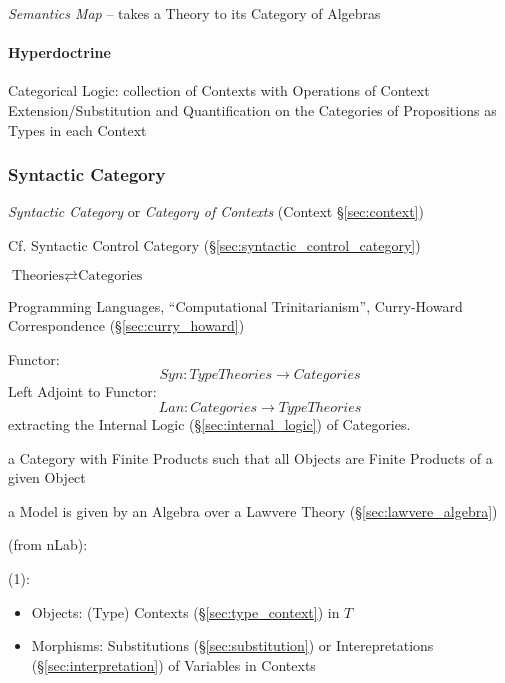 \emph{Semantics Map} -- takes a Theory to its Category of Algebras



\paragraph{Hyperdoctrine}\label{sec:hyperdoctrine}\hfill

Categorical Logic: collection of Contexts with Operations of Context
Extension/Substitution and Quantification on the Categories of
Propositions as Types in each Context



\subsubsection{Syntactic Category}\label{sec:syntactic_category}

\emph{Syntactic Category} or \emph{Category of Contexts} (Context
\S\ref{sec:context})

\fist Cf. Syntactic Control Category
(\S\ref{sec:syntactic_control_category})

$\text{Theories} \rightleftarrows \text{Categories}$

Programming Languages, ``Computational Trinitarianism'', Curry-Howard
Correspondence (\S\ref{sec:curry_howard})

Functor:
\[
  Syn : TypeTheories \rightarrow Categories
\]
Left Adjoint to Functor:
\[
  Lan : Categories \rightarrow TypeTheories
\]
extracting the Internal Logic (\S\ref{sec:internal_logic}) of
Categories.

a Category with Finite Products such
that all Objects are Finite Products of a given Object %

a Model is given by an Algebra over a Lawvere Theory
(\S\ref{sec:lawvere_algebra})


(from nLab):

(1):

\begin{itemize}
  \item Objects: (Type) Contexts (\S\ref{sec:type_context}) in $T$
  \item Morphisms: Substitutions (\S\ref{sec:substitution}) or
    Interepretations (\S\ref{sec:interpretation}) of Variables in
    Contexts
\end{itemize}

